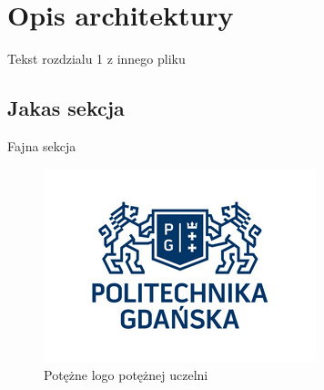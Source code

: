 \chapter{Opis architektury}
Tekst rozdzialu 1 z innego pliku
\section{Jakas sekcja}
Fajna sekcja
\begin{figure}[ht]
\centering
\includegraphics[scale=1.0]{img/pglogo}
\caption{Potężne logo potężnej uczelni}
\label{img/chapter_1_1}
\end{figure}
